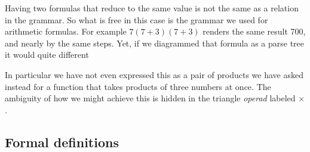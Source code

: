 \begin{remark}
    Having two formulas that reduce to the same value is not the same 
as a relation in the grammar.  So what is free in this case 
is the grammar we used for arithmetic formulas.  
For example $7(7+3)(7+3)$ renders the same result 700, and nearly 
by the same steps.  Yet, if we diagrammed that formula as a
parse tree it would quite different
\begin{center}
\end{center}    
In particular we have not even expressed this as a pair of products 
we have asked instead for a function that takes products of three 
numbers at once.  The ambiguity of how we might achieve this is hidden in the 
triangle \emph{operad} labeled $\times$.
\end{remark}

\subsection{Formal definitions}

